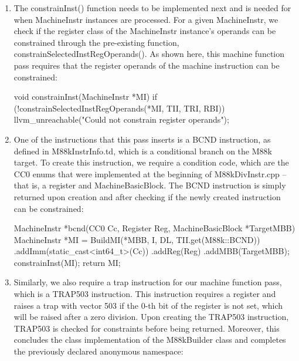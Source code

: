 \begin{enumerate}
\item
The constrainInst() function needs to be implemented next and is needed for when MachineInstr instances are processed. For a given MachineInstr, we check if the register class of the MachineInstr instance’s operands can be constrained through the pre-existing function, constrainSelectedInstRegOperands(). As shown here, this machine function pass requires that the register operands of the machine instruction can be constrained:

\begin{cpp}
void constrainInst(MachineInstr *MI) {
    if (!constrainSelectedInstRegOperands(*MI, TII, TRI, RBI))
    llvm_unreachable("Could not constrain register operands");
}
\end{cpp}

\item
One of the instructions that this pass inserts is a BCND instruction, as defined in M88kInstrInfo.td, which is a conditional branch on the M88k target. To create this instruction, we require a condition code, which are the CC0 enums that were implemented at the beginning of M88kDivInstr.cpp – that is, a register and MachineBasicBlock. The BCND instruction is simply returned upon creation and after checking if the newly created instruction can be constrained:

\begin{cpp}
MachineInstr *bcnd(CC0 Cc, Register Reg, MachineBasicBlock
    *TargetMBB) {
    MachineInstr *MI = BuildMI(*MBB, I, DL, TII.get(M88k::BCND))
                            .addImm(static_cast<int64_t>(Cc))
                            .addReg(Reg)
                            .addMBB(TargetMBB);
    constrainInst(MI);
    return MI;
}
\end{cpp}

\item
Similarly, we also require a trap instruction for our machine function pass, which is a TRAP503 instruction. This instruction requires a register and raises a trap with vector 503 if the 0-th bit of the register is not set, which will be raised after a zero division. Upon creating the TRAP503 instruction, TRAP503 is checked for constraints before being returned. Moreover, this concludes the class implementation of the M88kBuilder class and completes the previously declared anonymous namespace:

\begin{cpp}
    MachineInstr *trap503(Register Reg) {
        MachineInstr *MI = BuildMI(*MBB, I, DL, TII.
            get(M88k::TRAP503)).addReg(Reg);
        constrainInst(MI);
        return MI;
    }
};
} // end anonymous namespace
\end{cpp}


\end{enumerate}
